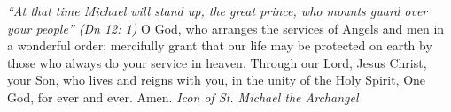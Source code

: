\pagestyle{empty}
\hspace{0pt}
\vfill

\textit{``At that time Michael will stand up, the great prince, who
mounts guard over your people'' (Dn 12: 1)}
\medbreak
O God, who arranges the services of Angels and men in a
wonderful order; mercifully grant that our life may be protected on
earth by those who always do your service in heaven. Through our
Lord, Jesus Christ, your Son, who lives and reigns with you, in the
unity of the Holy Spirit, One God, for ever and ever. Amen.
\vfill
\textit{Icon of St. Michael the Archangel}
\hspace{0pt}
\newpage
